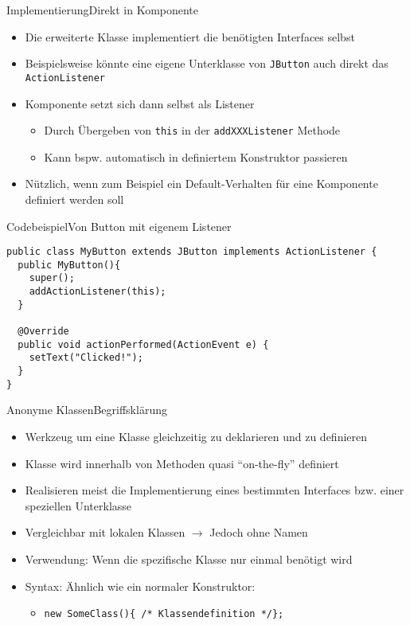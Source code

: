 \begin{frame}{Implementierung}{Direkt in Komponente}
    \begin{itemize}
        \item Die erweiterte Klasse implementiert die benötigten Interfaces selbst
        \item Beispielsweise könnte eine eigene Unterklasse von \texttt{JButton} auch direkt das \texttt{ActionListener}
        \item Komponente setzt sich dann selbst als Listener
        \begin{itemize}
            \item Durch Übergeben von \texttt{this} in der \texttt{addXXXListener} Methode
            \item Kann bspw. automatisch in definiertem Konstruktor passieren
        \end{itemize}
        \item Nützlich, wenn zum Beispiel ein Default-Verhalten für eine Komponente definiert werden soll
    \end{itemize}
\end{frame}

\begin{frame}[fragile]{Codebeispiel}{Von Button mit eigenem Listener}
\lstset{style=java}
\begin{lstlisting}
public class MyButton extends JButton implements ActionListener {
  public MyButton(){
    super();
    addActionListener(this);
  }
  
  @Override
  public void actionPerformed(ActionEvent e) {
    setText("Clicked!");
  }
}
\end{lstlisting}
\end{frame}

\begin{frame}{Anonyme Klassen}{Begriffsklärung}
    \begin{itemize}
        \item Werkzeug um eine Klasse gleichzeitig zu deklarieren und zu definieren
        \item Klasse wird innerhalb von Methoden quasi "`on-the-fly"' definiert
        \item Realisieren meist die Implementierung eines bestimmten Interfaces bzw. einer speziellen Unterklasse
        \item Vergleichbar mit lokalen Klassen $\rightarrow$ Jedoch ohne Namen
        \item Verwendung: Wenn die spezifische Klasse nur einmal benötigt wird
        \item Syntax: Ähnlich wie ein normaler Konstruktor:
        \begin{itemize}
            \item \texttt{new SomeClass()\{ /* Klassendefinition */\};}
        \end{itemize}
    \end{itemize}
\end{frame}

